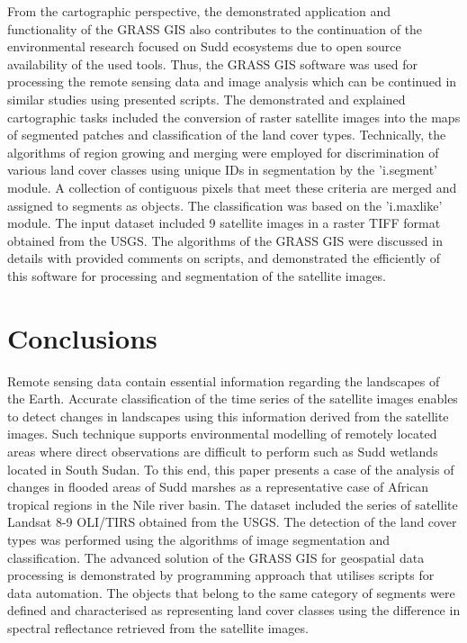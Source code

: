 \documentclass[analytics,article,submit,pdftex,moreauthors]{Definitions/mdpi}
\begin{document}
From the cartographic perspective, the demonstrated application and functionality of the GRASS GIS also contributes to the continuation of the environmental research focused on Sudd ecosystems due to open source availability of the used tools. Thus, the GRASS GIS software was used for processing the remote sensing data and image analysis which can be continued in similar studies using presented scripts. The demonstrated and explained cartographic tasks included the conversion of raster satellite images into the maps of segmented patches and classification of the land cover types. Technically, the algorithms of region growing and merging were employed for discrimination of various land cover classes using unique IDs in segmentation by the 'i.segment' module. A collection of contiguous pixels that meet these criteria are merged and assigned to segments as objects. The classification was based on the 'i.maxlike' module. The input dataset included 9 satellite images in a raster TIFF format obtained from the USGS. The algorithms of the GRASS GIS were discussed in details with provided comments on scripts, and demonstrated the efficiently of this software for processing and segmentation of the satellite images.

\section{Conclusions}

Remote sensing data contain essential information regarding the landscapes of the Earth. Accurate classification of the time series of the satellite images enables to detect changes in landscapes using this information derived from the satellite images. Such technique supports environmental modelling of remotely located areas where direct observations are difficult to perform such as Sudd wetlands located in South Sudan. To this end, this paper presents a case of the analysis of changes in flooded areas of Sudd marshes as a representative case of African tropical regions in the Nile river basin. The dataset included the series of satellite Landsat 8-9 OLI/TIRS obtained from the USGS. The detection of the land cover types was performed using the algorithms of image segmentation and classification. The advanced solution of the GRASS GIS for geospatial data processing is demonstrated by programming approach that utilises scripts for data automation. The objects that belong to the same category of segments were defined and characterised as representing land cover classes using the difference in spectral reflectance retrieved from the satellite images. 
\end{document}
